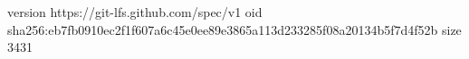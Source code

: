 version https://git-lfs.github.com/spec/v1
oid sha256:eb7fb0910ec2f1f607a6c45e0ee89e3865a113d233285f08a20134b5f7d4f52b
size 3431
